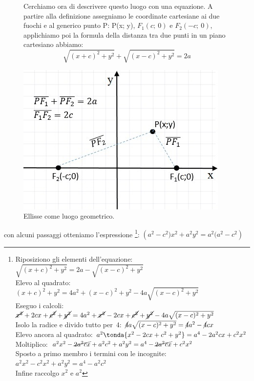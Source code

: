 \begin{figure}[h]
\noindent\begin{minipage}{.50\textwidth}
Cerchiamo ora di descrivere questo luogo con una equazione. A partire alla 
definizione assegniamo le coordinate cartesiane ai due fuochi e al generico 
punto P: P(x; y), \( F_{1}(c;~0)\) e \( F_{2} (-c;~0)\), applichiamo poi la 
formula della distanza tra due punti in un piano cartesiano abbiamo:
\[\sqrt{(x+c)^{2}+y^{2}}+\sqrt{(x-c)^{2}+y^{2}}=2a\]
\end{minipage}
\hfill
\begin{minipage}{.48\textwidth}
\begin{center}
  \includegraphics[width=.9\textwidth]{img/PF1F2.jpg}
  \caption{Ellisse come luogo geometrico.}
\end{center}
\end{minipage} 
\end{figure}

con alcuni passaggi otteniamo l'espressione
\footnote{
Riposiziono gli elementi dell'equazione:  \quad
\(\sqrt{(x+c)^2+y^2} = 2a - \sqrt{(x-c)^2+y^2}\)\\
Elevo al quadrato: \quad
\((x+c)^2+y^2 = 4a^2+(x-c)^2+y^2 -4a \sqrt{(x-c)^2+y^2}\)\\
Eseguo i calcoli: \quad
\(\cancel{x^2}+2cx+\cancel{c^2}+\cancel{y^2} = 
  4a^2+\cancel{x^2}-2cx+\cancel{c^2}+\cancel{y^2} 
  -4a \sqrt{(x-c)^2+y^2}\)\\
Isolo la radice e divido tutto per~4: \quad
\(\cancel{4}a \sqrt{(x-c)^2+y^2} = \cancel{4}a^2-\cancel{4}cx\)\\
Elevo ancora al quadrato:  \quad
\(a^2 \tonda{x^2-2cx+c^2+y^2} = a^4-2a^2cx+c^2x^2\)\\
Moltiplico: \quad
\(a^2x^2-\cancel{2a^2cx}+a^2c^2+a^2y^2 = a^4-\cancel{2a^2cx}+c^2x^2\)\\
Sposto a primo membro i termini con le incognite: \quad
\(a^2x^2-c^2x^2+a^2y^2 = a^4-a^2c^2\)\\
Infine raccolgo \(x^2\) e \(a^2\)
}: \quad
\(\left( a^{2}-c^{2})x^{2}+a^{2}y^{2}=a^{2}(a^{2}-c^{2}\right)\)

